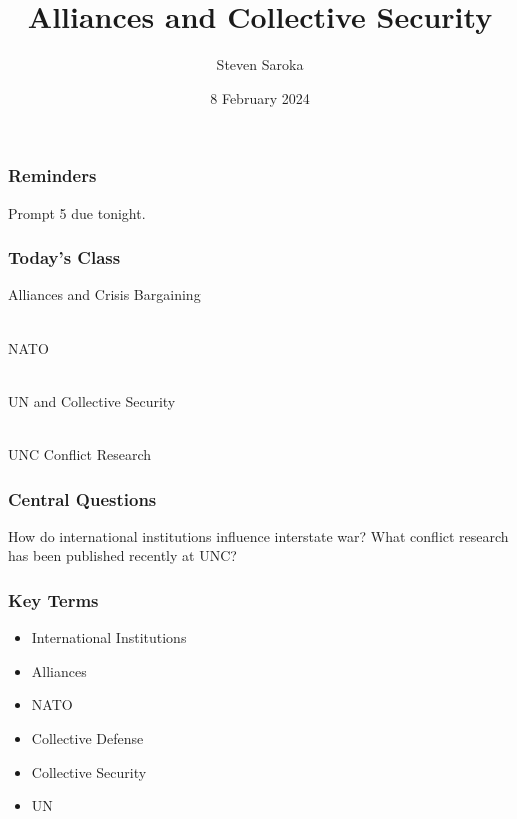 \documentclass{beamer}
\title[Alliances and Collective Security]{\LARGE{Alliances and Collective Security}}
\author[POLI 150]{Steven Saroka}
\institute{POLI 150}
\date{8 February 2024}
\begin{document}
\begin{frame}
\titlepage %
\end{frame}




\begin{frame} 
	\frametitle{\LARGE{Reminders}}
	\begin{itemize}
		\Large{
			\item Prompt 5 due tonight.

		}
	\end{itemize}
\end{frame}

\begin{frame} 
	\frametitle{\LARGE{Today's Class}}
	\begin{itemize}
		\Large{
			\item Alliances and Crisis Bargaining
			\\~\\ 
			\item NATO
			\\~\\
			\item UN and Collective Security
			\\~\\
			\item UNC Conflict Research
		}
	\end{itemize}
\end{frame}

\begin{frame} 
	\frametitle{\LARGE{Central Questions}}
	\centering
	\Large{How do international institutions influence interstate war? What conflict research has been published recently at UNC?}
\end{frame}

\begin{frame} 
	\frametitle{\LARGE{Key Terms}}
	\begin{itemize}
		\item International Institutions
		\item Alliances 
		\item NATO
		\item Collective Defense
		\item Collective Security
		\item UN
	\end{itemize}
\end{frame}
\end{document}
